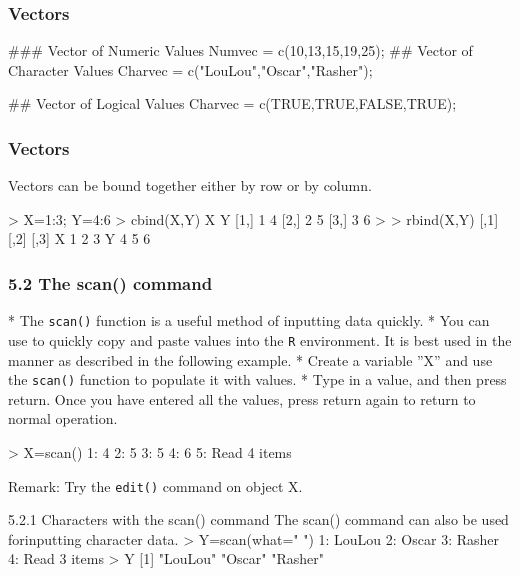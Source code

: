  
 
 \frametitle{Vectors}
 \begin{framed}
 \begin{semiverbatim}
 ### Vector of Numeric Values
 Numvec = c(10,13,15,19,25);
 ## Vector of Character Values
 Charvec = c("LouLou","Oscar","Rasher");
 
 ## Vector of Logical Values
 Charvec = c(TRUE,TRUE,FALSE,TRUE);
 \end{semiverbatim}
 \end{framed}
 
 
 \frametitle{Vectors}
 Vectors can be bound together either by row or by column.
 \begin{framed}
 \begin{semiverbatim}
 > X=1:3; Y=4:6
 > cbind(X,Y)
 X Y
 [1,] 1 4
 [2,] 2 5
 [3,] 3 6
 >
 > rbind(X,Y)
 [,1] [,2] [,3]
 X 1 2 3
 Y 4 5 6
 \end{semiverbatim}
 \end{framed}
 
 
 \frametitle{5.2 The scan() command}
 
* The \texttt{scan()} function is a useful method of inputting data quickly. 
*  You can use to quickly copy
 and paste values into the \texttt{R} environment. It is best used in the manner as described in the
 following example. 
*  Create a variable ”X” and use the \texttt{scan()} function to populate it with
 values. 
*  Type in a value, and then press return. Once you have entered all the values, press
 return again to return to normal operation.

 
 
 \begin{semiverbatim}
 > X=scan()
 1: 4
 2: 5
 3: 5
 4: 6
 5:
 Read 4 items
 \end{semiverbatim}
 Remark: Try the \texttt{edit()} command on object X.
 
 
 5.2.1 Characters with the scan() command
 The scan() command can also be used forinputting character data.
 > Y=scan(what=" ")
 1: LouLou
 2: Oscar
 3: Rasher
 4:
 Read 3 items
 > Y
 [1] "LouLou" "Oscar" "Rasher"
 

